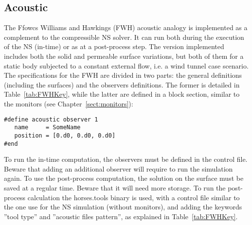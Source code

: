\documentclass[a4paper,10pt]{report}
\begin{document}
\subsection{Acoustic}
The Ffowcs Williams and Hawkings (FWH) acoustic analogy is implemented as a complement to the compressible NS solver. It can run both during the execution of the NS (in-time) or as at a post-process step. The version implemented includes both the solid and permeable surface variations, but both of them for a static body subjected to a constant external flow, i.e. a wind tunnel case scenario. The specifications for the FWH are divided in two parts: the general definitions (including the surfaces) and the observers definitions. The former is detailed in Table~\ref{tab:FWHKey}, while the latter are defined in a block section, similar to the monitors (see Chapter~\ref{sect:monitors}):

\begin{lstlisting}
#define acoustic observer 1
   name     = SomeName
   position = [0.d0, 0.d0, 0.d0]
#end
\end{lstlisting}

To run the in-time computation, the observers must be defined in the control file. Beware that adding an additional observer will require to run the simulation again. To use the post-process computation, the solution on the surface must be saved at a regular time. Beware that it will need more storage. To run the post-process calculation the horses.tools binary is used, with a control file similar to the one use for the NS simulation (without monitors), and adding the keywords ''tool type'' and ''acoustic files pattern'', as explained in Table~\ref{tab:FWHKey}.
\end{document}
